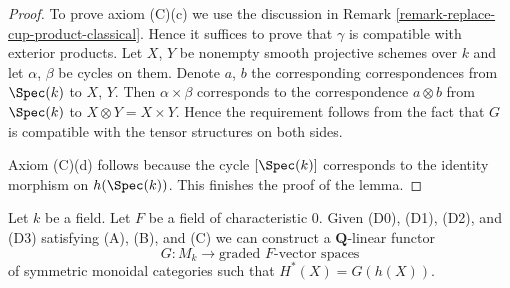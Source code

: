 \begin{proof}
\medskip\noindent
To prove axiom (C)(c) we use the discussion in
Remark \ref{remark-replace-cup-product-classical}.
Hence it suffices to prove that $\gamma$ is compatible with
exterior products. Let $X$, $Y$ be nonempty smooth projective
schemes over $k$ and let $\alpha$, $\beta$ be cycles on them. Denote
$a$, $b$ the corresponding correspondences from $\Spec(k)$ to
$X$, $Y$. Then $\alpha \times \beta$ corresponds to the
correspondence $a \otimes b$ from $\Spec(k)$ to $X \otimes Y = X \times Y$.
Hence the requirement follows from the fact that $G$ is
compatible with the tensor structures on both sides.

\medskip\noindent
Axiom (C)(d) follows because the cycle $[\Spec(k)]$
corresponds to the identity morphism on $h(\Spec(k))$.
This finishes the proof of the lemma.
\end{proof}

\begin{lemma}
\label{lemma-from-weil-to-functor}
Let $k$ be a field. Let $F$ be a field of characteristic $0$. Given
(D0), (D1), (D2), and (D3) satisfying (A), (B), and (C)
we can construct a $\mathbf{Q}$-linear functor
$$
G : M_k \longrightarrow \text{graded }F\text{-vector spaces}
$$
of symmetric monoidal categories such that $H^*(X) = G(h(X))$.
\end{lemma}

